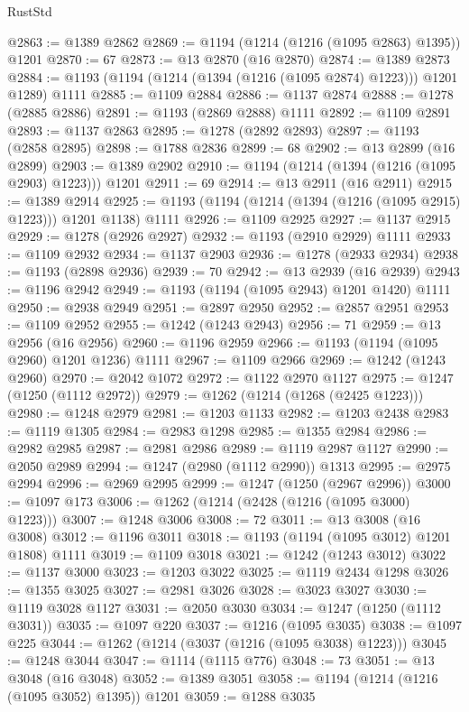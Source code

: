 \begin{lexlean}{RustStd}
\begin{coremodule}
@2863 := @1389 @2862
@2869 := @1194 (@1214 (@1216 (@1095 @2863) @1395)) @1201
@2870 := 67
@2873 := @13 @2870 (@16 @2870)
@2874 := @1389 @2873
@2884 := @1193 (@1194 (@1214 (@1394 (@1216 (@1095 @2874) @1223))) @1201 @1289) @1111
@2885 := @1109 @2884
@2886 := @1137 @2874
@2888 := @1278 (@2885 @2886)
@2891 := @1193 (@2869 @2888) @1111
@2892 := @1109 @2891
@2893 := @1137 @2863
@2895 := @1278 (@2892 @2893)
@2897 := @1193 (@2858 @2895)
@2898 := @1788 @2836
@2899 := 68
@2902 := @13 @2899 (@16 @2899)
@2903 := @1389 @2902
@2910 := @1194 (@1214 (@1394 (@1216 (@1095 @2903) @1223))) @1201
@2911 := 69
@2914 := @13 @2911 (@16 @2911)
@2915 := @1389 @2914
@2925 := @1193 (@1194 (@1214 (@1394 (@1216 (@1095 @2915) @1223))) @1201 @1138) @1111
@2926 := @1109 @2925
@2927 := @1137 @2915
@2929 := @1278 (@2926 @2927)
@2932 := @1193 (@2910 @2929) @1111
@2933 := @1109 @2932
@2934 := @1137 @2903
@2936 := @1278 (@2933 @2934)
@2938 := @1193 (@2898 @2936)
@2939 := 70
@2942 := @13 @2939 (@16 @2939)
@2943 := @1196 @2942
@2949 := @1193 (@1194 (@1095 @2943) @1201 @1420) @1111
@2950 := @2938 @2949
@2951 := @2897 @2950
@2952 := @2857 @2951
@2953 := @1109 @2952
@2955 := @1242 (@1243 @2943)
@2956 := 71
@2959 := @13 @2956 (@16 @2956)
@2960 := @1196 @2959
@2966 := @1193 (@1194 (@1095 @2960) @1201 @1236) @1111
@2967 := @1109 @2966
@2969 := @1242 (@1243 @2960)
@2970 := @2042 @1072
@2972 := @1122 @2970 @1127
@2975 := @1247 (@1250 (@1112 @2972))
@2979 := @1262 (@1214 (@1268 (@2425 @1223)))
@2980 := @1248 @2979
@2981 := @1203 @1133
@2982 := @1203 @2438
@2983 := @1119 @1305
@2984 := @2983 @1298
@2985 := @1355 @2984
@2986 := @2982 @2985
@2987 := @2981 @2986
@2989 := @1119 @2987 @1127
@2990 := @2050 @2989
@2994 := @1247 (@2980 (@1112 @2990)) @1313
@2995 := @2975 @2994
@2996 := @2969 @2995
@2999 := @1247 (@1250 (@2967 @2996))
@3000 := @1097 @173
@3006 := @1262 (@1214 (@2428 (@1216 (@1095 @3000) @1223)))
@3007 := @1248 @3006
@3008 := 72
@3011 := @13 @3008 (@16 @3008)
@3012 := @1196 @3011
@3018 := @1193 (@1194 (@1095 @3012) @1201 @1808) @1111
@3019 := @1109 @3018
@3021 := @1242 (@1243 @3012)
@3022 := @1137 @3000
@3023 := @1203 @3022
@3025 := @1119 @2434 @1298
@3026 := @1355 @3025
@3027 := @2981 @3026
@3028 := @3023 @3027
@3030 := @1119 @3028 @1127
@3031 := @2050 @3030
@3034 := @1247 (@1250 (@1112 @3031))
@3035 := @1097 @220
@3037 := @1216 (@1095 @3035)
@3038 := @1097 @225
@3044 := @1262 (@1214 (@3037 (@1216 (@1095 @3038) @1223)))
@3045 := @1248 @3044
@3047 := @1114 (@1115 @776)
@3048 := 73
@3051 := @13 @3048 (@16 @3048)
@3052 := @1389 @3051
@3058 := @1194 (@1214 (@1216 (@1095 @3052) @1395)) @1201
@3059 := @1288 @3035

\end{coremodule}
\end{lexlean}

